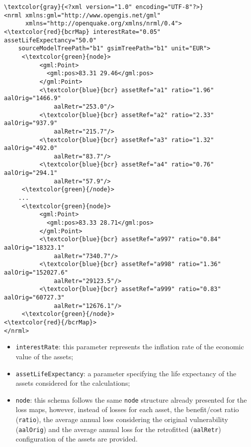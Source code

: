 \begin{Verbatim}[frame=single, commandchars=\\\{\}, samepage=false]
\textcolor{gray}{<?xml version="1.0" encoding="UTF-8"?>}
<nrml xmlns:gml="http://www.opengis.net/gml"
      xmlns="http://openquake.org/xmlns/nrml/0.4">
<\textcolor{red}{bcrMap} interestRate="0.05" assetLifeExpectancy="50.0" 
    sourceModelTreePath="b1" gsimTreePath="b1" unit="EUR">
     <\textcolor{green}{node}>
          <gml:Point>
            <gml:pos>83.31 29.46</gml:pos>
          </gml:Point>
          <\textcolor{blue}{bcr} assetRef="a1" ratio="1.96" aalOrig="1466.9" 
              aalRetr="253.0"/>
          <\textcolor{blue}{bcr} assetRef="a2" ratio="2.33" aalOrig="937.9" 
              aalRetr="215.7"/>
          <\textcolor{blue}{bcr} assetRef="a3" ratio="1.32" aalOrig="492.0" 
              aalRetr="83.7"/>
          <\textcolor{blue}{bcr} assetRef="a4" ratio="0.76" aalOrig="294.1" 
              aalRetr="57.9"/>          
     <\textcolor{green}{/node}>
    ...
     <\textcolor{green}{node}>
          <gml:Point>
            <gml:pos>83.33 28.71</gml:pos>
          </gml:Point>
          <\textcolor{blue}{bcr} assetRef="a997" ratio="0.84" aalOrig="18323.1" 
              aalRetr="7340.7"/>
          <\textcolor{blue}{bcr} assetRef="a998" ratio="1.36" aalOrig="152027.6" 
              aalRetr="29123.5"/>
          <\textcolor{blue}{bcr} assetRef="a999" ratio="0.83" aalOrig="60727.3" 
              aalRetr="12676.1"/>
     <\textcolor{green}{/node}>
<\textcolor{red}{/bcrMap}>
</nrml>
\end{Verbatim}

\begin{itemize}
\item  \Verb+interestRate+: this parameter represents the inflation rate of the economic value of the assets;
\item  \Verb+assetLifeExpectancy+: a parameter specifying the life expectancy of the assets considered for the calculations;
\item  \Verb+node+: this schema follows the same \Verb+node+ structure already presented for the loss maps, however, instead of losses for each asset, the benefit/cost ratio (\Verb+ratio+), the average annual loss considering the original vulnerability (\Verb+aalOrig+) and the average annual loss for the retrofitted (\Verb+aalRetr+) configuration  of the assets are provided. 
\end{itemize}